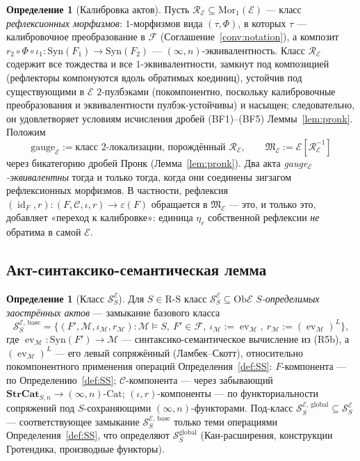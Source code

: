 \documentclass[11pt]{article}
\theoremstyle{plain}
\theoremstyle{definition}
\newtheorem{definition}[theorem]{Определение}
\newcommand{\RS}{\mathrm{R\text{-}S}}
\newcommand{\cS}{\mathcal{S}}
\newcommand{\cF}{\mathcal{F}}
\newcommand{\cM}{\mathcal{M}}
\newcommand{\cC}{\mathcal{C}}
\newcommand{\fM}{\mathfrak{M}}
\newcommand{\Ob}{\mathrm{Ob}}
\newcommand{\Mor}{\mathrm{Mor}}
\newcommand{\Cat}{\mathrm{Cat}}
\newcommand{\Syn}{\mathrm{Syn}}
\newcommand{\cE}{\mathcal{E}}
\newcommand{\SSE}{\cS_{S}^{\cE}}
\DeclareMathOperator{\id}{id}
\DeclareMathOperator{\ev}{ev}
\newcommand{\SSEbase}{\cS_{S}^{\cE,\,\mathrm{base}}}
\newcommand{\SSEglobal}{\cS_{S}^{\cE,\,\mathrm{global}}}
\begin{document}
\begin{definition}[Калибровка актов]\label{def:gauge-E}
Пусть $\mathcal{R}_\cE \subseteq \Mor_1(\cE)$ — класс \emph{рефлексионных морфизмов}: $1$-морфизмов вида $(\tau, \Phi)$, в которых $\tau$ — калибровочное преобразование в $\cF$ (Соглашение~\ref{conv:notation}), а композит $r_2 \circ \Phi \circ \iota_1 : \Syn(F_1) \to \Syn(F_2)$ — $(\infty, n)$-эквивалентность. Класс $\mathcal{R}_\cE$ содержит все тождества и все $1$-эквивалентности, замкнут под композицией (рефлекторы компонуются вдоль обратимых коединиц), устойчив под существующими в $\cE$ $2$-пулбэками (покомпонентно, поскольку калибровочные преобразования и эквивалентности пулбэк-устойчивы) и насыщен; следовательно, он удовлетворяет условиям исчисления дробей (BF1)--(BF5) Леммы~\ref{lem:pronk}. Положим
\[ \mathrm{gauge}_\cE := \text{класс $2$-локализации, порождённый } \mathcal{R}_\cE, \qquad \fM_\cE := \cE[\mathcal{R}_\cE^{-1}] \]
через бикатегорию дробей Пронк (Лемма~\ref{lem:pronk}). Два акта \emph{gauge$_\cE$-эквивалентны} тогда и только тогда, когда они соединены зигзагом рефлексионных морфизмов. В частности, рефлексия $(\id_F, r) : (F, \cC, \iota, r) \to \varepsilon(F)$ обращается в $\fM_\cE$ --- это, и только это, добавляет «переход к калибровке»: единица $\eta_r$ собственной рефлексии \emph{не} обратима в самой $\cE$.
\end{definition}

\subsection{Акт-синтаксико-семантическая лемма}

\begin{definition}[Класс $\SSE$]\label{def:SSE}
Для $S \in \RS$ класс $\SSE \subseteq \Ob \cE$ \emph{$S$-определимых заострённых актов} — замыкание базового класса
\[
  \SSEbase = \bigl\{ (F', \cM, \iota_\cM, r_\cM) : \cM \models S,\ F' \in \cF,\ \iota_\cM := \ev_\cM,\ r_\cM := (\ev_\cM)^L \bigr\},
\]
где $\ev_\cM : \Syn(F') \to \cM$ — синтаксико-семантическое вычисление из (R5b), а $(\ev_\cM)^L$ — его левый сопряжённый (Ламбек--Скотт), относительно покомпонентного применения операций Определения~\ref{def:SS}: $F$-компонента — по Определению~\ref{def:SS}; $\cC$-компонента — через забывающий $\mathbf{StrCat}_{S, n} \to (\infty, n)\text{-}\Cat$; $(\iota, r)$-компоненты — по функториальности сопряжений под $S$-сохраняющими $(\infty, n)$-функторами. Под-класс $\SSEglobal \subseteq \SSE$ — соответствующее замыкание $\SSEbase$ только теми операциями Определения~\ref{def:SS}, что определяют $\cS_S^{\mathrm{global}}$ (Кан-расширения, конструкции Гротендика, производные функторы).
\end{definition}
\end{document}
